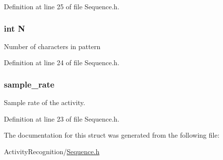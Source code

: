 Definition at line 25 of file Sequence.h.

\hypertarget{struct___sequence_a7722c8ecbb62d99aee7ce68b1752f337}{
\subsubsection[{N}]{\setlength{\rightskip}{0pt plus 5cm}int {\bf N}}}
\label{struct___sequence_a7722c8ecbb62d99aee7ce68b1752f337}
Number of characters in pattern 

Definition at line 24 of file Sequence.h.

\hypertarget{struct___sequence_a699592f96d08e00211f2e1ae82cfeb60}{
\subsubsection[{sample\_\-rate}]{ {\bf sample\_\-rate}}}
\label{struct___sequence_a699592f96d08e00211f2e1ae82cfeb60}
Sample rate of the activity. 

Definition at line 23 of file Sequence.h.



The documentation for this struct was generated from the following file:\begin{DoxyCompactItemize}
\item 
ActivityRecognition/\hyperlink{_sequence_8h}{Sequence.h}\end{DoxyCompactItemize}
